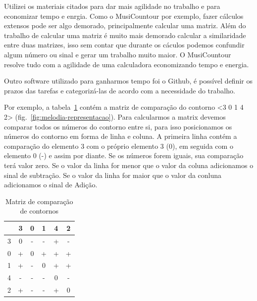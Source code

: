 \documentclass[11pt]{article}
\begin{document}
Utilizei os materiais citados para dar mais agilidade no trabalho e para
economizar tempo e enrgia. Como o MusiCountour por exemplo, fazer cálculos
extensos pode ser algo demorado, principalmente calcular uma matriz. Além do trabalho
de calcular uma matriz é muito mais demorado calcular a similaridade entre duas matrizes,
isso sem contar que durante os cáculos podemos confundir algum número ou sinal e gerar um
trabalho muito maior. O MusiCountour resolve tudo com a agilidade de uma calculadora
economizando tempo e energia.

Outro software utilizado para ganharmos tempo foi o Github, é possível definir os
prazos das tarefas e categorizá-las de acordo com a necessidade do trabalho.

Por exemplo, a tabela~\ref{tab:matriz-comparacao-contornos} contém
a matriz de comparação do contorno <3 0 1 4 2> (fig.~\ref{fig:melodia-representacao}).
Para calcularmos a matrix devemos comparar
todos os números do contorno entre si, para isso posicionamos os
números do contorno em forma de linha e coluna.
A primeira linha contém a comparação do elemento 3 com o próprio elemento 3 (0),
em seguida com o elemento 0 (-) e assim por diante. Se os números forem iguais,
sua comparação terá valor zero. Se o valor da linha for menor que o valor da
coluna adicionamos o sinal de subtração. Se o valor da linha for maior
que o valor da conluna adicionamos o sinal de Adição.

\begin{table}
  \centering
  \begin{tabular}{c|ccccc}
    &3&0&1&4&2\\
    \hline
    3&0&-&-&+&-\\
    0&+&0&+&+&+\\
    1&+&-&0&+&+\\
    4&-&-&-&0&-\\
    2&+&-&-&+&0\\
  \end{tabular}
  \caption{Matriz de comparação de contornos}
  \label{tab:matriz-comparacao-contornos}
\end{table}
\end{document}
